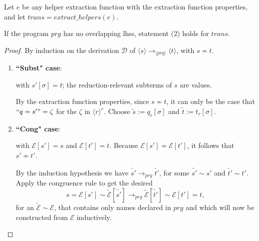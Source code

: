 \begin{proposition}

Let $e$ be any helper extraction function with the extraction function properties, and let $trans = extract\_helpers(e)$.

If the program $prg$ has no overlapping lhss, statement (2) holds for $trans$.

\begin{proof} By induction on the derivation $\mathcal{D}$ of $\langle s \rangle \longrightarrow_{\langle prg \rangle} \langle t \rangle$, with $s \not\sim t$.

\begin{enumerate}
\item \textbf{``Subst" case}:

\begin{prooftree}
\end{prooftree}

with $s'[\sigma] = t$; the reduction-relevant subterms of $s$ are values.

By the extraction function properties, since $s \not\sim t$, it can only be the case that $`` q = s' " = \zeta$ for the $\zeta$ in $\langle r \rangle^e$. Choose $\widetilde{s} := q_r[\sigma]$ and $\widetilde{t} := t_r[\sigma]$.

\item \textbf{``Cong" case}:

\begin{prooftree}
\end{prooftree}

with $\mathcal{E}[s'] = s$ and $\mathcal{E}[t'] = t$. Because $\mathcal{E}[s'] \not\sim \mathcal{E}[t']$, it follows that $s' \not\sim t'$.

By the induction hypothesis we have $\widetilde{s'} \longrightarrow_{prg} \widetilde{t'}$, for some $\widetilde{s'} \sim s'$ and $\widetilde{t'} \sim t'$. Apply the congruence rule to get the desired
\begin{equation*}
s = \mathcal{E}[s'] \sim \widetilde{\mathcal{E}}[\widetilde{s'}] \longrightarrow_{prg} \widetilde{\mathcal{E}}[\widetilde{t'}] \sim \mathcal{E}[t'] = t,
\end{equation*}
for an $\widetilde{\mathcal{E}} \sim \mathcal{E}$, that contains only names declared in $prg$ and which will now be constructed from $\mathcal{E}$ inductively.


\end{enumerate}
\end{proof}
\end{proposition}
